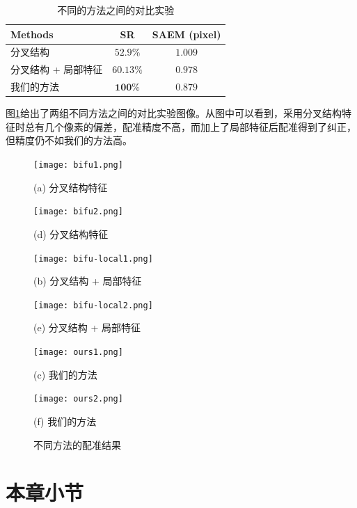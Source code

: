 \begin{table}[!ht]
\caption{不同的方法之间的对比实验}
\centering
\begin{tabular}{lcc}
\toprule
Methods & SR & SAEM (pixel)\\
\midrule
分叉结构 & $52.9\%$ & $1.009$\\
分叉结构 + 局部特征& $60.13\%$ & $0.978$\\
我们的方法 & $\mathbf{100\%}$ & $\mathbf{0.879}$\\
\bottomrule
\end{tabular}
\label{tab:methods}
\end{table}
图\ref{fig:methods-fig}给出了两组不同方法之间的对比实验图像。从图中可以看到，采用分叉结构特征时总有几个像素的偏差，配准精度不高，而加上了局部特征后配准得到了纠正，但精度仍不如我们的方法高。
\begin{figure}[!ht]
\centering
\begin{minipage}[b]{0.48\textwidth} 
      \centering 
      \texttt{[image: bifu1.png]}
        \centerline{(a) 分叉结构特征}\medskip
\end{minipage}
  \begin{minipage}[b]{0.48\textwidth}
    \centering
    \texttt{[image: bifu2.png]}
      \centerline{(d) 分叉结构特征}\medskip
  \end{minipage}
  \begin{minipage}[b]{0.48\textwidth}
    \centering
    \texttt{[image: bifu-local1.png]}
      \centerline{(b) 分叉结构 + 局部特征}\medskip
  \end{minipage}
 \begin{minipage}[b]{0.48\textwidth}
    \centering
      \texttt{[image: bifu-local2.png]}
        \centerline{(e) 分叉结构 + 局部特征}\medskip
    \end{minipage}
\begin{minipage}[b]{0.48\textwidth}
	\centering
      \texttt{[image: ours1.png]}
        \centerline{(c) 我们的方法}\medskip
    \end{minipage}
  \begin{minipage}[b]{0.48\textwidth}
    \centering
    \texttt{[image: ours2.png]}
      \centerline{(f) 我们的方法}\medskip
  \end{minipage}
\caption{不同方法的配准结果}
\label{fig:methods-fig}
\end{figure}

\section{本章小节}
\label{}

